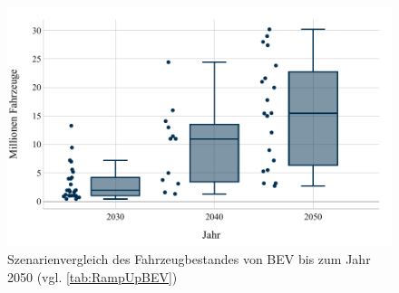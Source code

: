 \begin{figure}[H]
    \centering
    \includegraphics[width=\textwidth]{Bilder/RampUp-BEV-MA}
    \caption[Szenarienvergleich des Fahrzeugbestandes von BEV bis zum Jahr \num{2050}]{Szenarienvergleich des Fahrzeugbestandes von BEV bis zum Jahr \num{2050} (vgl. \autoref{tab:RampUpBEV})}\label{fig:RampUpBEV}
\end{figure}
